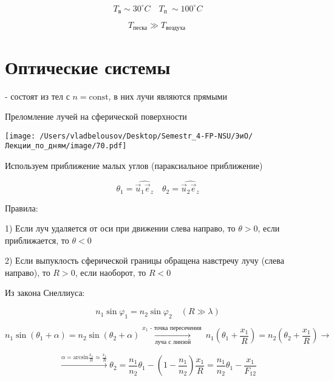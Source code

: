 \documentclass[12pt, a4paper]{report}
\begin{document}
\[ T_{\text{в} } \sim 30^{\circ } C \quad T_{\text{п }  } \sim  100^{\circ } C    \] 

\[ T_{\text{песка} }\gg T_{\text{воздуха } }   \] 

\section{Оптические системы}

- состоят из тел с \( n = \mathrm{const}   \), в них лучи являются прямыми 

Преломление лучей на сферической поверхности

\begin{center}
    \texttt{[image: /Users/vladbelousov/Desktop/Semestr\_4-FP-NSU/ЭиО/Лекции\_по\_дням/image/70.pdf]}
\end{center}



Используем приближение малых углов (параксиальное приближение)

\[ \theta_1 = \widehat{\vec{u } _1 \vec{e } _z }  \quad  \theta_2 = \widehat{\vec{u } _2 \vec{e } _z }     \] 

Правила:

1) Если луч удаляется от оси при движении слева направо, то \( \theta> 0  \), если приближается, то \( \theta<0 \) 

2) Если выпуклость сферической границы обращена  навстречу лучу (слева направо), то \( R>0 \), если наоборот, то \( R<0 \) 

Из закона Снеллиуса: 

\[ n_1 \sin \varphi_1 = n_2 \sin \varphi_2 \quad  (R \gg \lambda ) \] 

\[ n_1 \sin  (\theta_1 + \alpha ) = n_2 \sin (\theta_2 +\alpha ) \underset{\text{луча с линзой} }{\xrightarrow{x_1 \text{ - точка пересечения } }}    n_1\left( \theta_1 + \frac{x_1}{R}  \right) = n_2\left( \theta_2 + \frac{x_1}{R}  \right) \to   \]  

\[ \xrightarrow{\alpha = \mathrm{arcsin } \frac{x_1}{R } \approx \frac{x_1}{R}  } \theta_2 = \frac{n_1}{n_2 } \theta_1 - \left( 1 - \frac{n_1}{n_2}  \right) \frac{x_1}{R }  = \frac{n_1}{n_2 } \theta_1 - \frac{x_1}{F_{12}}      \] 


\ifdefined\mainfile
\else
    
\end{document}
